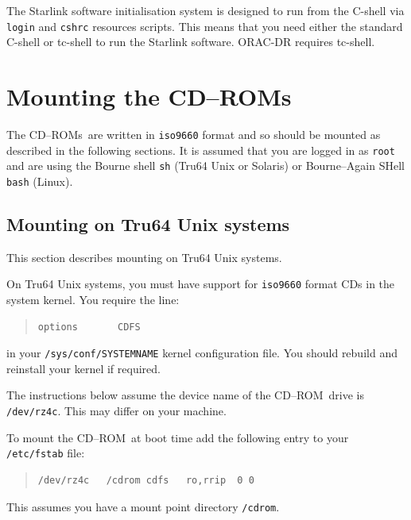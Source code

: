 \documentclass[twoside,11pt]{article}
\newcommand{\xlabel}[1]{}
\renewcommand{\_}{\texttt{\symbol{95}}}
\newcommand{\cdrom}{CD--ROM}
\newcommand{\cdrom}{CD-ROM}
\newcommand{\cdroms}{CD--ROMs}
\newcommand{\cdroms}{CD-ROMs}
\begin{document}
The Starlink software initialisation system is designed to run from the
C-shell via \texttt{login} and \texttt{cshrc} resources scripts.  This means
that you need either the standard C-shell or tc-shell to run the
Starlink software.  ORAC-DR requires tc-shell.

\newpage
\section{\xlabel{mounting_the_cdroms}Mounting the \cdroms}
\label{mounting_the_cdroms}

The \cdroms\ are written in \texttt{iso9660} format and so should be
mounted as described in the following sections.  It is assumed that you
are logged in as \texttt{root} and are using the Bourne shell
\texttt{sh} (Tru64 Unix or Solaris) or Bourne--Again SHell
\texttt{bash} (Linux).

\subsection{\xlabel{mounting_on_alpha}Mounting on Tru64 Unix systems}
\label{mounting_on_alpha}

This section describes mounting on Tru64 Unix systems.

On Tru64 Unix systems, you must have support for \texttt{iso9660} format CDs
in the system kernel.  You require the line:

\begin{quote}
\begin{verbatim}
options       CDFS
\end{verbatim}
\end{quote}

in your \texttt{/sys/conf/SYSTEM\_NAME} kernel configuration file.  You should
rebuild and reinstall your kernel if required.

The instructions below assume the device name of the \cdrom\ drive is
\texttt{/dev/rz4c}.  This may differ on your machine.

To mount the \cdrom\ at boot time add the following entry to your
\texttt{/etc/fstab} file:

\begin{quote}
\begin{verbatim}
/dev/rz4c   /cdrom cdfs   ro,rrip  0 0
\end{verbatim}
\end{quote}

This assumes you have a mount point directory \texttt{/cdrom}.
\end{document}
